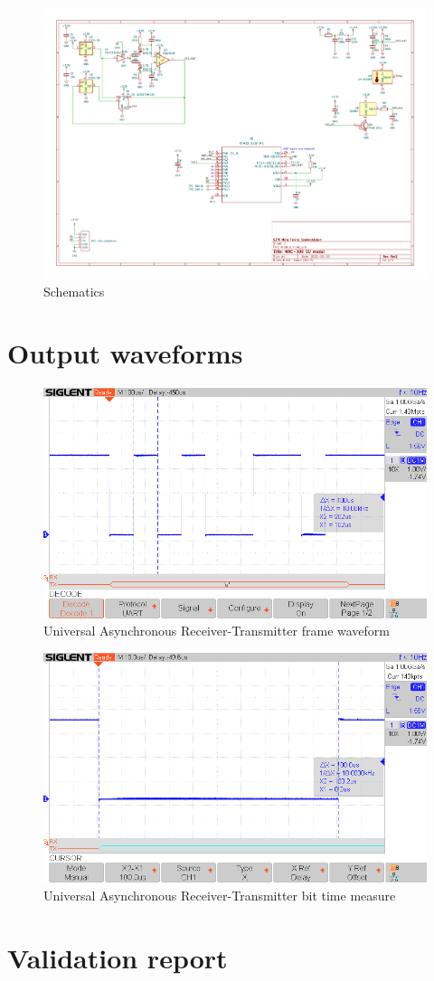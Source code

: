 \documentclass[10pt]{datasheet}
\begin{document}
\begin{figure}
	\centering
	\includegraphics[width=1.2\textwidth,angle = 90]{sch}
	\caption{Schematics}
\end{figure}

\section{Output waveforms}

\begin{figure}
	\centering
	\includegraphics[width=1\textwidth]{SDS1}
	\caption{Universal Asynchronous Receiver-Transmitter frame waveform}
\end{figure}


\begin{figure}
	\centering
	\includegraphics[width=1\textwidth]{SDS2}
	\caption{Universal Asynchronous Receiver-Transmitter bit time measure}
\end{figure}

\newpage
\section{Validation report}

\end{document}
